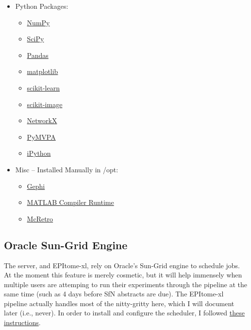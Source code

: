 \documentclass[final,titlepage,letterpaper,oneside,12pt]{article}
\renewcommand{\texttt}[2][BrickRed]{\textcolor{#1}{\ttfamily #2}}%
\begin{document}
\begin{small}
\begin{itemize}
    \item{Python Packages:}
    \begin{itemize} \itemsep-2pt
        \item{\href{http://www.numpy.org/}{NumPy}}
        \item{\href{http://www.scipy.org/}{SciPy}} 
        \item{\href{http://pandas.pydata.org/}{Pandas}}
        \item{\href{http://matplotlib.org/}{matplotlib}}
        \item{\href{http://scikit-learn.org/stable/}{scikit-learn}}
        \item{\href{http://scikit-image.org/}{scikit-image}}
        \item{\href{http://networkx.github.io/}{NetworkX}}
        \item{\href{http://www.pymvpa.org/}{PyMVPA}}
        \item{\href{http://ipython.org/}{iPython}}
    \end{itemize}

    \item{Misc -- Installed Manually in \texttt{/opt}:}
    \begin{itemize} \itemsep-2pt
        \item{\href{https://gephi.org/}{Gephi}}
        \item{\href{http://www.mathworks.com/products/compiler/mcr/}{MATLAB Compiler Runtime}}
        \item{\href{http://afni.nimh.nih.gov/sscc/dglen/McRetroTS}{McRetro}}
    \end{itemize}

\end{itemize}
\end{small}

\subsection{Oracle Sun-Grid Engine}
The server, and EPItome-xl, rely on Oracle's Sun-Grid engine to schedule jobs. At the moment this feature is merely cosmetic, but it will help immensely when multiple users are attemping to run their experiments through the pipeline at the same time (such as 4 days before SfN abstracts are due). The EPItome-xl pipeline actually handles most of the nitty-gritty here, which I will document later (i.e., {\color{red}never}). In order to install and configure the scheduler, I followed \href{http://www.socher.org/index.php/Main/HowToInstallSunGridEngineOnUbuntu}{these instructions}.  
\end{document}
